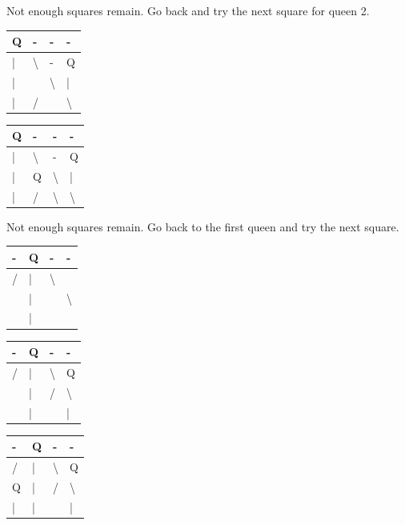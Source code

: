 \documentclass{article}
\begin{document}
\begin{enumerate}
Not enough squares remain. Go back and try the next square for queen 2. 

\begin{table}[H]
\begin{tabular}{|l|l|l|l|}
\hline
Q & - & - & - \\ \hline
| & \textbackslash{} & - & Q \\ \hline
| &  & \textbackslash{} & | \\ \hline
| & / &  & \textbackslash{} \\ \hline
\end{tabular}
\end{table}


\begin{table}[H]
\begin{tabular}{|l|l|l|l|}
\hline
Q & - & - & - \\ \hline
| & \textbackslash{} & - & Q \\ \hline
| & Q & \textbackslash{} & | \\ \hline
| & / & \textbackslash{} & \textbackslash{} \\ \hline
\end{tabular}
\end{table}

Not enough squares remain. Go back to the first queen and try the next square. 

\begin{table}[H]
\begin{tabular}{|l|l|l|l|}
\hline
- & Q & - & - \\ \hline
/ & | & \textbackslash{} &  \\ \hline
 & | &  & \textbackslash{} \\ \hline
 & | &  &  \\ \hline
\end{tabular}
\end{table}


\begin{table}[H]
\begin{tabular}{|l|l|l|l|}
\hline
- & Q & - & - \\ \hline
/ & | & \textbackslash{} & Q \\ \hline
 & | & / & \textbackslash{} \\ \hline
 & | &  & | \\ \hline
\end{tabular}
\end{table}


\begin{table}[H]
\begin{tabular}{|l|l|l|l|}
\hline
- & Q & - & - \\ \hline
/ & | & \textbackslash{} & Q \\ \hline
Q & | & / & \textbackslash{} \\ \hline
| & | &  & | \\ \hline
\end{tabular}
\end{table}



\end{enumerate}
\end{document}
